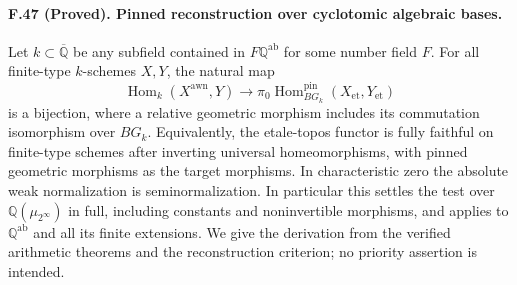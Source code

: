 \paragraph{F.47 (Proved). Pinned reconstruction over cyclotomic algebraic bases.}
Let $k\subset\overline{\mathbb Q}$ be any subfield contained in
$F\mathbb Q^{\mathrm{ab}}$ for some number field $F$. For all
finite-type $k$-schemes $X,Y$, the natural map
\[
 \operatorname{Hom}_k(X^{\mathrm{awn}},Y)
   \longrightarrow
 \pi_0\operatorname{Hom}^{\mathrm{pin}}_{B G_k}
                 (X_{\mathrm{et}},Y_{\mathrm{et}})
\]
is a bijection, where a relative geometric morphism includes its
commutation isomorphism over $B G_k$. Equivalently, the etale-topos
functor is fully faithful on finite-type schemes after inverting
universal homeomorphisms, with pinned geometric morphisms as the
target morphisms. In characteristic zero the absolute weak
normalization is seminormalization. In particular this settles the
test over $\mathbb Q(\mu_{2^\infty})$ in full, including constants
and noninvertible morphisms, and applies to $\mathbb Q^{\mathrm{ab}}$
and all its finite extensions. We give the derivation from the
verified arithmetic theorems and the reconstruction criterion;
no priority assertion is intended.

